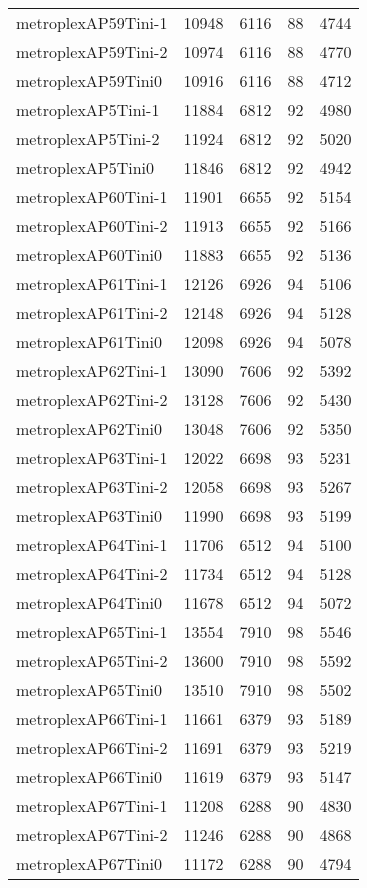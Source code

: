 \begin{longtable}{lrrrr}
metroplexAP59Tini-1 & 10948 & 6116 & 88 & 4744 \\
metroplexAP59Tini-2 & 10974 & 6116 & 88 & 4770 \\
metroplexAP59Tini0 & 10916 & 6116 & 88 & 4712 \\
metroplexAP5Tini-1 & 11884 & 6812 & 92 & 4980 \\
metroplexAP5Tini-2 & 11924 & 6812 & 92 & 5020 \\
metroplexAP5Tini0 & 11846 & 6812 & 92 & 4942 \\
metroplexAP60Tini-1 & 11901 & 6655 & 92 & 5154 \\
metroplexAP60Tini-2 & 11913 & 6655 & 92 & 5166 \\
metroplexAP60Tini0 & 11883 & 6655 & 92 & 5136 \\
metroplexAP61Tini-1 & 12126 & 6926 & 94 & 5106 \\
metroplexAP61Tini-2 & 12148 & 6926 & 94 & 5128 \\
metroplexAP61Tini0 & 12098 & 6926 & 94 & 5078 \\
metroplexAP62Tini-1 & 13090 & 7606 & 92 & 5392 \\
metroplexAP62Tini-2 & 13128 & 7606 & 92 & 5430 \\
metroplexAP62Tini0 & 13048 & 7606 & 92 & 5350 \\
metroplexAP63Tini-1 & 12022 & 6698 & 93 & 5231 \\
metroplexAP63Tini-2 & 12058 & 6698 & 93 & 5267 \\
metroplexAP63Tini0 & 11990 & 6698 & 93 & 5199 \\
metroplexAP64Tini-1 & 11706 & 6512 & 94 & 5100 \\
metroplexAP64Tini-2 & 11734 & 6512 & 94 & 5128 \\
metroplexAP64Tini0 & 11678 & 6512 & 94 & 5072 \\
metroplexAP65Tini-1 & 13554 & 7910 & 98 & 5546 \\
metroplexAP65Tini-2 & 13600 & 7910 & 98 & 5592 \\
metroplexAP65Tini0 & 13510 & 7910 & 98 & 5502 \\
metroplexAP66Tini-1 & 11661 & 6379 & 93 & 5189 \\
metroplexAP66Tini-2 & 11691 & 6379 & 93 & 5219 \\
metroplexAP66Tini0 & 11619 & 6379 & 93 & 5147 \\
metroplexAP67Tini-1 & 11208 & 6288 & 90 & 4830 \\
metroplexAP67Tini-2 & 11246 & 6288 & 90 & 4868 \\
metroplexAP67Tini0 & 11172 & 6288 & 90 & 4794 \\

\end{longtable}
